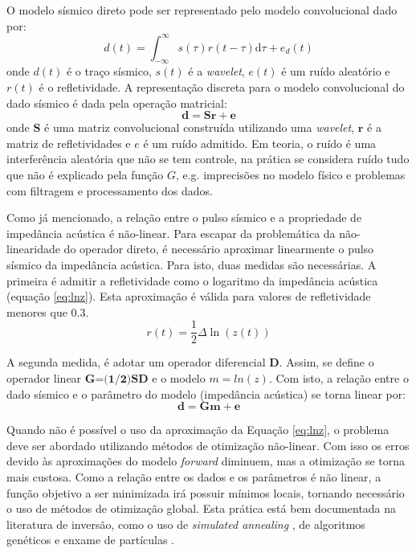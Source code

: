 O modelo sísmico direto pode ser representado pelo modelo convolucional dado por:
\begin{equation}
d(t) = \int_{-\infty}^{\infty} s(\tau) r(t - \tau)\mathrm{d}\tau + e_{d}(t)
\label{eq:conmodel}
\end{equation}
onde $d(t)$ é o traço sísmico, $s(t)$ é a \textit{wavelet}, $e(t)$ é
um ruído aleatório e $r(t)$ é o refletividade.
A representação discreta para o modelo convolucional do dado sísmico é
dada pela operação matricial: 
\begin{equation}
\label{eq:sismDiscreta}
\mathbf{d = Sr + e}
\end{equation}
onde $\mathbf{S}$ é uma matriz convolucional construída utilizando uma
\textit{wavelet}, $\mathbf{r}$ é a matriz de refletividades e $e$ é um
ruído admitido. Em teoria, o ruído é uma interferência aleatória que não se tem
controle, na prática se considera ruído tudo que não é explicado pela função
$G$, e.g. imprecisões no modelo físico e problemas com filtragem e processamento
dos dados.

Como já mencionado, a relação entre o pulso sísmico e a
propriedade de impedância acústica é não-linear.
Para escapar da problemática da não-linearidade do operador direto, é
necessário aproximar linearmente o pulso sísmico da impedância acústica.
Para isto, duas medidas são necessárias. A primeira é admitir a 
refletividade como o logaritmo da impedância acústica (equação \ref{eq:lnz}).
Esta aproximação é válida para valores de refletividade menores que $0.3$.
\begin{equation}
r(t) = \frac{1}{2}\Delta \ln(z(t))
\label{eq:lnz}
\end{equation}

A segunda medida, é adotar um operador diferencial $\textbf{D}$. Assim,
se define o operador linear $\textbf{G=(1/2)SD}$ e o modelo $m=ln(z)$.
Com isto, a relação entre o dado sísmico e o parâmetro do modelo (impedância acústica)
se torna linear por:
\begin{equation}
\label{eq:sismDiscreta2}
\mathbf{d = Gm + e}
\end{equation}

Quando não é possível o uso da aproximação da Equação \ref{eq:lnz}, o problema
deve ser abordado utilizando métodos de otimização não-linear. Com isso os erros
devido às aproximações do modelo \textit{forward} diminuem, mas a otimização se
torna mais custosa. Como a relação entre os dados e os parâmetros é não linear, a
função objetivo a ser minimizada irá possuir mínimos locais, tornando necessário
o uso de métodos de otimização global. Esta prática está bem documentada na
literatura de inversão, como o uso de \textit{simulated annealing}
\citep{max_inv_simulated}, de algoritmos genéticos \citep{MallickGeneticInve} e
enxame de partículas \citep{zhe_nonlinear}. 

